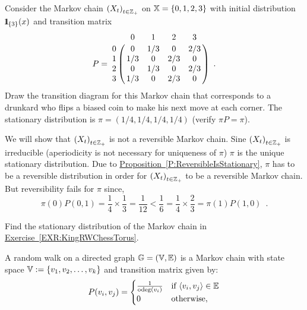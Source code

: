 \begin{example}\label{SIM:DrunkardsBiasedWalkBlock}
Consider the Markov chain $\left(X_t\right)_{t \in \mathbb{Z}_+}$ on $\mathbb{X}=\{0,1,2,3\}$ with initial distribution ${1}\mspace{-11 mu}{1}_{\{3\}}(x)$ and transition matrix 
$$P = 
\bordermatrix{~ & 0 & 1 & 2 & 3 \cr 
0 & 0 & 1/3 & 0 & 2/3\cr
1 & 1/3 & 0 & 2/3 & 0\cr
2 & 0 & 1/3 & 0 & 2/3\cr
3 & 1/3 & 0 & 2/3 & 0 } \enspace .
$$
Draw the transition diagram for this Markov chain that corresponds to a drunkard who flips a biased coin to make his next move at each corner.  The stationary distribution is $\pi = (1/4,1/4,1/4,1/4)$ (verify $\pi P= \pi$).  

We will show that $\left(X_t\right)_{t \in \mathbb{Z}_+}$ is not a reversible Markov chain.  
Sine $\left(X_t\right)_{t \in \mathbb{Z}_+}$ is irreducible (aperiodicity is not necessary for uniqueness of $\pi$) $\pi$ is the unique stationary distribution.  
Due to \hyperref[P:ReversibleIsStationary]{Proposition~\ref*{P:ReversibleIsStationary}}, $\pi$ has to be a reversible distribution in order for $\left(X_t\right)_{t \in \mathbb{Z}_+}$ to be a reversible Markov chain.  
But reversibility fails for $\pi$ since,
\[
\pi(0) P(0,1) = \frac{1}{4} \times \frac{1}{3} = \frac{1}{12} < \frac{1}{6} = \frac{1}{4} \times \frac{2}{3} = \pi(1)P(1,0) \enspace .
\]
\end{example}

\begin{exercise}\label{EXR:PiKingRWChessTorus}
Find the stationary distribution of the Markov chain in \hyperref[EXR:KingRWChessTorus]{Exercise~\ref*{EXR:KingRWChessTorus}}.
\end{exercise}

\begin{model}\label{M:RWDGraph}
A random walk on a directed graph $\mathbb{G}=(\mathbb{V},\mathbb{E})$ is a Markov chain with state space $\mathbb{V}:= \{v_1,v_2,\ldots,v_k\}$ and transition matrix given by:
\[
P(v_i,v_j) = 
\begin{cases}
\frac{1}{\operatorname{odeg}(v_i)} & \text{if $\langle v_i, v_j \rangle \in \mathbb{E}$}\\
0 & \text{otherwise} ,
\end{cases}
\]
\end{model}

